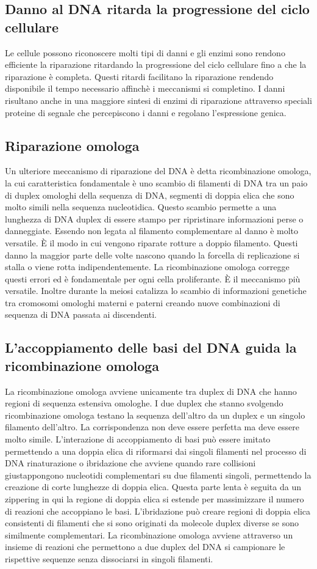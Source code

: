 \subsection{Danno al DNA ritarda la progressione del ciclo cellulare}
Le cellule possono riconoscere molti tipi di danni e gli enzimi sono rendono efficiente la riparazione ritardando la progressione del ciclo cellulare fino a che la riparazione \`e 
completa. Questi ritardi facilitano la riparazione rendendo disponibile il tempo necessario affinch\`e i meccanismi si completino. I danni risultano anche in una maggiore sintesi di 
enzimi di riparazione attraverso speciali proteine di segnale che percepiscono i danni e regolano l'espressione genica. 
\subsection{Riparazione omologa}
Un ulteriore meccanismo di riparazione del DNA \`e detta ricombinazione omologa, la cui caratteristica fondamentale \`e uno scambio di filamenti di DNA tra un paio di duplex omologhi
della sequenza di DNA, segmenti di doppia elica che sono molto simili nella sequenza nucleotidica. Questo scambio permette a una lunghezza di DNA duplex di essere stampo per 
ripristinare informazioni perse o danneggiate. Essendo non legata al filamento complementare al danno \`e molto versatile. \`E il modo in cui vengono riparate rotture a doppio filamento.
Questi danno la maggior parte delle volte nascono quando la forcella di replicazione si stalla o viene rotta indipendentemente. La ricombinazione omologa corregge questi errori ed \`e
fondamentale per ogni cella proliferante. \`E il meccanismo pi\`u versatile. Inoltre durante la meiosi catalizza lo scambio di informazioni genetiche tra cromosomi omologhi materni e 
paterni creando nuove combinazioni di sequenza di DNA passata ai discendenti. 
\subsection{L'accoppiamento delle basi del DNA guida la ricombinazione omologa}
La ricombinazione omologa avviene unicamente tra duplex di DNA che hanno regioni di sequenza estensiva omologhe. I due duplex che stanno svolgendo ricombinazione omologa testano la 
sequenza dell'altro  da un duplex e un singolo filamento dell'altro. La corrispondenza non deve essere perfetta ma deve essere molto simile. L'interazione di accoppiamento di basi
pu\`o essere imitato permettendo a una doppia elica di riformarsi dai singoli filamenti nel processo di DNA rinaturazione o ibridazione che avviene quando rare collisioni giustappongono
nucleotidi complementari su due filamenti singoli, permettendo la creazione di corte lunghezze di doppia elica. Questa parte lenta \`e seguita da un zippering in qui la regione di doppia
elica si estende per massimizzare il numero di reazioni che accoppiano le basi. L'ibridazione pu\`o creare regioni di doppia elica consistenti di filamenti che si sono originati da 
molecole duplex diverse se sono similmente complementari. La ricombinazione omologa avviene attraverso un insieme di reazioni che permettono a due duplex del DNA si campionare le 
rispettive sequenze senza dissociarsi in singoli filamenti. 
